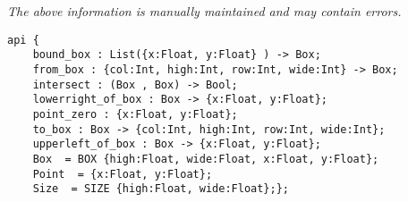 \label{pkg:geometry2d\_float}

{\tiny \it The above information is manually maintained and may contain errors.}
\begin{verbatim}
api {
    bound_box : List({x:Float, y:Float} ) -> Box;
    from_box : {col:Int, high:Int, row:Int, wide:Int} -> Box;
    intersect : (Box , Box) -> Bool;
    lowerright_of_box : Box -> {x:Float, y:Float};
    point_zero : {x:Float, y:Float};
    to_box : Box -> {col:Int, high:Int, row:Int, wide:Int};
    upperleft_of_box : Box -> {x:Float, y:Float};
    Box  = BOX {high:Float, wide:Float, x:Float, y:Float};
    Point  = {x:Float, y:Float};
    Size  = SIZE {high:Float, wide:Float};};
\end{verbatim}
